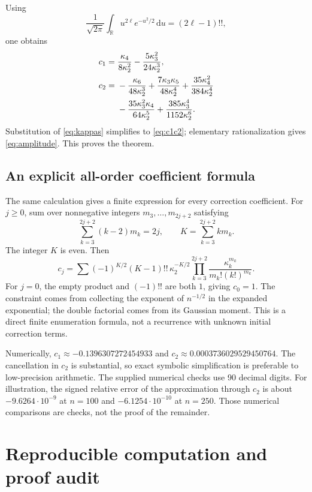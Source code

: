 \documentclass[11pt,a4paper]{article}
\numberwithin{equation}{section}
\theoremstyle{definition}
\theoremstyle{remark}
\newcommand{\R}{\mathbb R}
\newcommand{\dd}{\,\mathrm d}
\begin{document}
Using
\[
 \frac1{\sqrt{2\pi}}\int_{\R}u^{2\ell}e^{-u^2/2}\dd u=(2\ell-1)!!,
\]
one obtains
\begin{align}\label{eq:cumulant-corrections}
 c_1={}&\frac{\kappa_4}{8\kappa_2^2}
       -\frac{5\kappa_3^2}{24\kappa_2^3},\notag\\
 c_2={}&-\frac{\kappa_6}{48\kappa_2^3}
 +\frac{7\kappa_3\kappa_5}{48\kappa_2^4}
 +\frac{35\kappa_4^2}{384\kappa_2^4}\notag\\
 &-\frac{35\kappa_3^2\kappa_4}{64\kappa_2^5}
 +\frac{385\kappa_3^4}{1152\kappa_2^6}.
\end{align}
Substitution of \eqref{eq:kappas} simplifies to \eqref{eq:c1c2}; elementary
rationalization gives \eqref{eq:amplitude}. This proves the theorem.

\subsection{An explicit all-order coefficient formula}
The same calculation gives a finite expression for every correction
coefficient. For $j\ge0$, sum over nonnegative integers
$m_3,\ldots,m_{2j+2}$ satisfying
\[
 \sum_{k=3}^{2j+2}(k-2)m_k=2j,
 \qquad K=\sum_{k=3}^{2j+2}km_k.
\]
The integer $K$ is even. Then
\begin{equation}\label{eq:allorder}
 c_j=\sum
 (-1)^{K/2}(K-1)!!\,\kappa_2^{-K/2}
 \prod_{k=3}^{2j+2}\frac{\kappa_k^{m_k}}{m_k!(k!)^{m_k}}.
\end{equation}
For $j=0$, the empty product and $(-1)!!$ are both $1$, giving $c_0=1$.
The constraint comes from collecting the exponent of $n^{-1/2}$ in the
expanded exponential; the double factorial comes from its Gaussian moment.
This is a direct finite enumeration formula, not a recurrence with unknown
initial correction terms.

Numerically, $c_1\approx-0.1396307272454933$ and
$c_2\approx0.0003736029529450764$. The cancellation in $c_2$ is substantial,
so exact symbolic simplification is preferable to low-precision arithmetic.
The supplied numerical checks use 90 decimal digits. For illustration,
the signed relative error of the approximation through $c_2$ is about
$-9.6264\cdot10^{-9}$ at $n=100$ and $-6.1254\cdot10^{-10}$ at $n=250$.
Those numerical comparisons are checks, not the proof of the remainder.

\section{Reproducible computation and proof audit}
\label{sec:verification}
\end{document}
